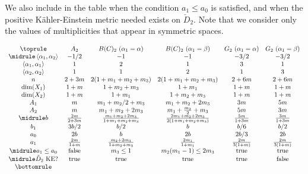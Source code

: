 \documentclass[10pt]{amsart}
\theoremstyle{plain}
\theoremstyle{definition}
\begin{document}
We also include in the table when the condition $a_1\leq a_0$ is satisfied,
and when the positive Kähler-Einstein metric needed exists on $\check{D}_2$.
Note that we consider only the values of multiplicities that appear in symmetric spaces.

\begin{table}
\begin{small}
\begin{equation*}
\begin{array}{cccccc}
\toprule
& A_2 & B(C)_2~(\alpha_1=\alpha) & B(C)_2~(\alpha_1=\beta) & G_2~(\alpha_1=\alpha) & G_2~(\alpha_1=\beta) \\
\midrule
\left<\alpha_1,\alpha_2\right> & -1/2 & -1 & -1 & -3/2 & -3/2\\
\left<\alpha_1,\alpha_1\right> & 1 & 2 &1 & 3 & 1\\
\left<\alpha_2,\alpha_2\right> & 1 & 1 &2 & 1 & 3\\
n & 2+3m & 2(1+m_1+m_2+m_3) & 2(1+m_1+m_2+m_3) & 2+6m & 2+6m \\
\dim(X_1) & 1+m & 1+m_2+m_3 & 1+m_1 & 1+m & 1+m \\
\dim(X_2) & 1+m & 1+m_1 & 1+m_2+m_3 & 1+m & 1+m \\
A_1 & m & m_1+m_2/2+m_3 & m_1+m_2+2m_3 & 3m & 5m \\
A_2 & m & m_1+m_2+2m_3 & m_1+\frac{m_2}{2}+m_3 & 5m & 3m \\
\midrule
b & \frac{2m}{2+3m} & \frac{m_1+m_2+2m_3}{1+m_1+m_2+m_3} & \frac{2m_1+m_2+2m_3}{2(1+m_1+m_2+m_3)} & \frac{5m}{1+3m} & \frac{3m}{1+3m} \\
b_1 & 3b/2 & b/2 & b & b/6 & b/2 \\
a_0 & 2b & b & 2b & 2b/3 & 2b \\
a_1 & \frac{2m}{1+m} & \frac{m_2+2m_3}{1+m_2+m_3} & \frac{2m_1}{1+m_1} & \frac{2m}{3(1+m)} & \frac{2m}{3(1+m)} \\
\midrule
a_1\leq a_0 & \mathrm{false} & m_3\leq 1 & m_2(m_1-1)\leq 2m_3 & \mathrm{true} & \mathrm{true} \\
\midrule
\check{D}_2~\mathrm{KE?} & \mathrm{true} & \mathrm{true} & \mathrm{true} & \mathrm{true} & \mathrm{false} \\
\bottomrule
\end{array}
\end{equation*}
\end{small}
\caption{Notable constants and conditions}
\label{tab:constants}
\end{table}
\end{document}
